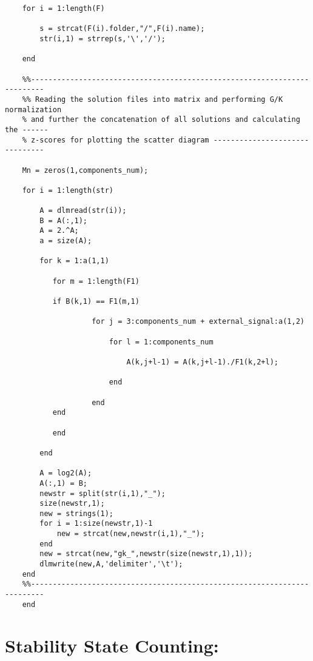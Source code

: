 \documentclass{article}
\begin{document}
\begin{verbatim}
    for i = 1:length(F)
        
        s = strcat(F(i).folder,"/",F(i).name);
        str(i,1) = strrep(s,'\','/');
        
    end
    
    %%-------------------------------------------------------------------------
    %% Reading the solution files into matrix and performing G/K normalization 
    % and further the concatenation of all solutions and calculating the ------
    % z-scores for plotting the scatter diagram -------------------------------
    
    Mn = zeros(1,components_num);
    
    for i = 1:length(str)
        
        A = dlmread(str(i));
        B = A(:,1);
        A = 2.^A;
        a = size(A);
        
        for k = 1:a(1,1)
            
           for m = 1:length(F1)
               
           if B(k,1) == F1(m,1)
    
                    for j = 3:components_num + external_signal:a(1,2)
                        
                        for l = 1:components_num
                   
                            A(k,j+l-1) = A(k,j+l-1)./F1(k,2+l);
                            
                        end
                   
                    end
           end
    
           end
           
        end
        
        A = log2(A);
        A(:,1) = B;
        newstr = split(str(i,1),"_");
        size(newstr,1);
        new = strings(1);
        for i = 1:size(newstr,1)-1
            new = strcat(new,newstr(i,1),"_");
        end
        new = strcat(new,"gk_",newstr(size(newstr,1),1));
        dlmwrite(new,A,'delimiter','\t');
    end
    %%-------------------------------------------------------------------------
    end
\end{verbatim}

\section*{Stability State Counting:}
\end{document}
